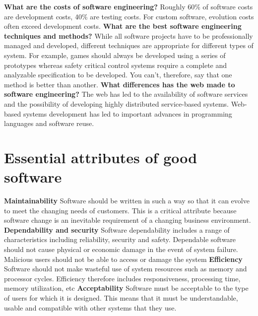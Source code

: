 \documentclass{report}
\begin{document}
\textbf{What are the costs of software engineering?}\newline
Roughly 60\% of software costs are development costs, 40\% are testing costs. For custom software, evolution costs often exceed development costs.
\newline\newline
\textbf{What are the best software engineering techniques and methods?}\newline
While all software projects have to be professionally managed and developed, different techniques are appropriate for different types of system. For example, games should always be developed using a series of prototypes whereas safety critical control systems require a complete and analyzable specification to be developed. You can’t, therefore, say that one method is better than another.
\newline\newline
\textbf{What differences has the web made to software engineering?}\newline
The web has led to the availability of software services and the possibility of developing highly distributed service-based systems. Web-based systems development has led to important advances in programming languages and software reuse.

\newpage
\section{Essential attributes of good software}
\textbf{Maintainability}\newline
Software should be written in such a way so that it can evolve to meet the changing needs of customers. This is a critical attribute because software change is an inevitable requirement of a changing business environment.
\newline\newline
\textbf{Dependability and security}\newline
Software dependability includes a range of characteristics including reliability, security and safety. Dependable software should not cause physical or economic damage in the event of
system failure. Malicious users should not be able to access or damage the system
\newline\newline
\textbf{Efficiency}\newline
Software should not make wasteful use of system resources such as memory and processor cycles. Efficiency therefore includes responsiveness, processing time, memory utilization, etc
\newline\newline
\textbf{Acceptability}\newline
Software must be acceptable to the type of users for which it is designed. This means that it must be understandable, usable and compatible with other systems that they use.
\end{document}
